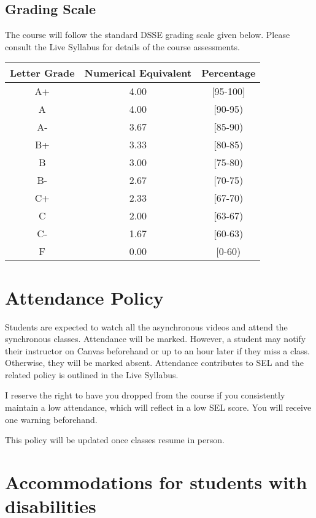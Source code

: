 \documentclass[a4paper]{article}
\begin{document}
\subsection{Grading Scale}

The course will follow the standard DSSE grading scale given below. Please consult the Live Syllabus for details of the course assessments.

\begin{center}
  \begin{tabular}{|*3{c|}}
\hline
Letter Grade & Numerical Equivalent & Percentage\\\hline\hline
A+ & 4.00 & [95-100] \\\hline
A & 4.00 & [90-95) \\\hline
A- & 3.67 & [85-90) \\\hline
B+ & 3.33 & [80-85) \\\hline
B & 3.00 & [75-80) \\\hline
B- & 2.67 & [70-75) \\\hline
C+ & 2.33 & [67-70) \\\hline
C & 2.00 & [63-67) \\\hline
C- & 1.67 & [60-63) \\\hline
F & 0.00 & [0-60) \\\hline
  \end{tabular}
\end{center}

\section{Attendance Policy}

Students are expected to watch all the asynchronous videos and attend the synchronous classes. Attendance will be marked. However, a student may notify their instructor on Canvas beforehand or up to an hour later if they miss a class. Otherwise, they will be marked absent. Attendance contributes to SEL and the related policy is outlined in the Live Syllabus.

I reserve the right to have you dropped from the course if you consistently maintain a low attendance, which will reflect in a low SEL score. You will receive one warning beforehand.

This policy will be updated once classes resume in person.

\section{Accommodations for students with disabilities}
\end{document}
